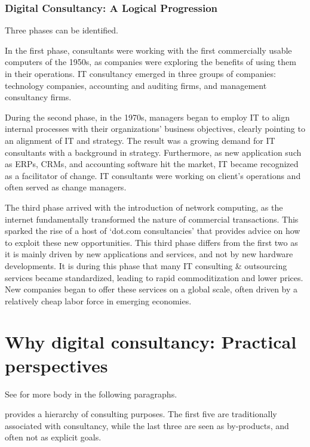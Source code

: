 \documentclass[12pt]{article}
\begin{document}
\hypertarget{digital-consultancy-a-logical-progression}{%
\subsubsection{Digital Consultancy: A Logical
Progression}\label{digital-consultancy-a-logical-progression}}

Three phases can be identified.

In the first phase, consultants were working with the first commercially
usable computers of the 1950s, as companies were exploring the benefits
of using them in their operations. IT consultancy emerged in three
groups of companies: technology companies, accounting and auditing
firms, and management consultancy firms. \citep[ 162]{kipping2012}

During the second phase, in the 1970s, managers began to employ IT to
align internal processes with their organizations' business objectives,
clearly pointing to an alignment of IT and strategy. The result was a
growing demand for IT consultants with a background in strategy.
Furthermore, as new application such as ERPs, CRMs, and accounting
software hit the market, IT became recognized as a facilitator of
change. IT consultants were working on client's operations and often
served as change managers.

The third phase arrived with the introduction of network computing, as
the internet fundamentally transformed the nature of commercial
transactions. This sparked the rise of a host of `dot.com consultancies'
that provides advice on how to exploit these new opportunities. This
third phase differs from the first two as it is mainly driven by new
applications and services, and not by new hardware developments. It is
during this phase that many IT consulting \& outsourcing services became
standardized, leading to rapid commoditization and lower prices. New
companies began to offer these services on a global scale, often driven
by a relatively cheap labor force in emerging economies.

\hypertarget{why-digital-consultancy-practical-perspectives}{%
\section{Why digital consultancy: Practical
perspectives}\label{why-digital-consultancy-practical-perspectives}}

See \citet{lacity1994} for more body in the following paragraphs.

\citet{turner1982} provides a hierarchy of consulting purposes. The
first five are traditionally associated with consultancy, while the last
three are seen as by-products, and often not as explicit goals.
\end{document}
